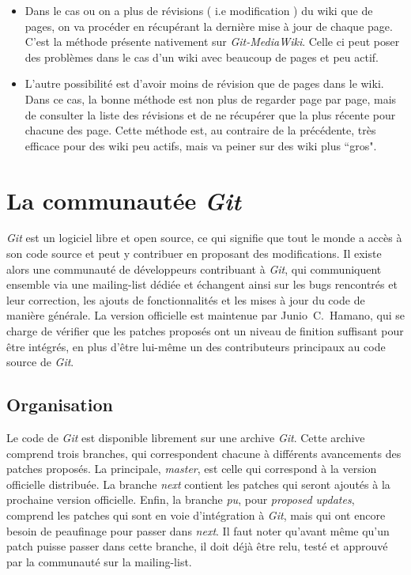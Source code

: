 \documentclass[11pt]{article}
\begin{document}
\begin{itemize}
\item Dans le cas ou on a plus de révisions ( i.e modification ) du wiki 
que de pages, on va procéder en récupérant la dernière mise à jour de chaque
page. C'est la méthode présente nativement sur \textit{Git-MediaWiki}. Celle
ci peut poser des problèmes dans le cas d'un wiki avec beaucoup de pages et
peu actif.\\
\item L'autre possibilité est d'avoir moins de révision que de pages dans le
wiki. Dans ce cas, la bonne méthode est non plus de regarder page par page,
mais de consulter la liste des révisions et de ne récupérer que la plus récente
pour chacune des page. Cette méthode est, au contraire de la précédente, très
efficace pour des wiki peu actifs, mais va peiner sur des wiki plus ``gros". 
\end{itemize}

\section{La communautée \textit{Git}}

\textit{Git} est un logiciel libre et open source, ce qui signifie que
tout le monde a accès à son code source et peut y contribuer en
proposant des modifications. Il existe alors une communauté de
développeurs contribuant à \textit{Git}, qui communiquent ensemble via
une mailing-list dédiée et échangent ainsi sur les bugs rencontrés et
leur correction, les ajouts de fonctionnalités et les mises à jour du
code de manière générale. La version officielle est maintenue par
Junio~C.~Hamano, qui se charge de vérifier que les patches proposés
ont un niveau de finition suffisant pour être intégrés, en plus d'être
lui-même un des contributeurs principaux au code source de \textit{Git}.

\subsection{Organisation}

Le code de \textit{Git} est disponible librement sur une archive
\textit{Git}. Cette archive comprend trois branches, qui correspondent
chacune à différents avancements des patches proposés. La principale,
\textit{master}, est celle qui correspond à la version officielle
distribuée. La branche \textit{next} contient les patches qui seront
ajoutés à la prochaine version officielle. Enfin, la branche
\textit{pu}, pour \textit{proposed updates}, comprend les patches qui
sont en voie d'intégration à \textit{Git}, mais qui ont encore besoin
de peaufinage pour passer dans \textit{next}. Il faut noter qu'avant
même qu'un patch puisse passer dans cette branche, il doit déjà être
relu, testé et approuvé par la communauté sur la mailing-list.
\end{document}
